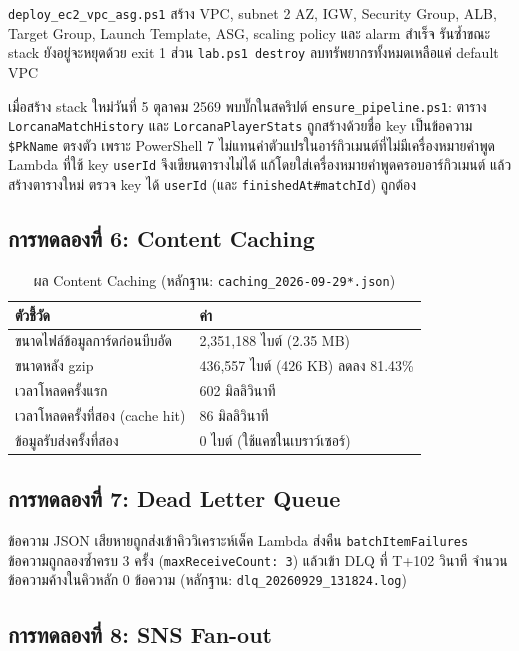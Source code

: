\texttt{deploy\_ec2\_vpc\_asg.ps1} สร้าง VPC, subnet 2 AZ, IGW, Security Group, ALB, Target Group, Launch Template, ASG, scaling policy และ alarm สำเร็จ รันซ้ำขณะ stack ยังอยู่จะหยุดด้วย exit 1 ส่วน \texttt{lab.ps1 destroy} ลบทรัพยากรทั้งหมดเหลือแค่ default VPC

เมื่อสร้าง stack ใหม่วันที่ 5 ตุลาคม 2569 พบบั๊กในสคริปต์ \texttt{ensure\_pipeline.ps1}: ตาราง \texttt{LorcanaMatchHistory} และ \texttt{LorcanaPlayerStats} ถูกสร้างด้วยชื่อ key เป็นข้อความ \texttt{\$PkName} ตรงตัว เพราะ PowerShell 7 ไม่แทนค่าตัวแปรในอาร์กิวเมนต์ที่ไม่มีเครื่องหมายคำพูด Lambda ที่ใช้ key \texttt{userId} จึงเขียนตารางไม่ได้ แก้โดยใส่เครื่องหมายคำพูดครอบอาร์กิวเมนต์ แล้วสร้างตารางใหม่ ตรวจ key ได้ \texttt{userId} (และ \texttt{finishedAt\#matchId}) ถูกต้อง

\subsection{การทดลองที่ 6: Content Caching}

\begin{table}[H]
\centering
\caption{ผล Content Caching (หลักฐาน: \texttt{caching\_2026-09-29*.json})}
\begin{tabularx}{\textwidth}{lX}
\toprule
\textbf{ตัวชี้วัด} & \textbf{ค่า} \\
\midrule
ขนาดไฟล์ข้อมูลการ์ดก่อนบีบอัด & 2,351,188 ไบต์ (2.35 MB) \\
ขนาดหลัง gzip & 436,557 ไบต์ (426 KB) ลดลง 81.43\% \\
เวลาโหลดครั้งแรก & 602 มิลลิวินาที \\
เวลาโหลดครั้งที่สอง (cache hit) & 86 มิลลิวินาที \\
ข้อมูลรับส่งครั้งที่สอง & 0 ไบต์ (ใช้แคชในเบราว์เซอร์) \\
\bottomrule
\end{tabularx}
\end{table}

\subsection{การทดลองที่ 7: Dead Letter Queue}

ข้อความ JSON เสียหายถูกส่งเข้าคิววิเคราะห์เด็ค Lambda ส่งคืน \texttt{batchItemFailures} ข้อความถูกลองซ้ำครบ 3 ครั้ง (\texttt{maxReceiveCount: 3}) แล้วเข้า DLQ ที่ T+102 วินาที จำนวนข้อความค้างในคิวหลัก 0 ข้อความ (หลักฐาน: \texttt{dlq\_20260929\_131824.log})

\subsection{การทดลองที่ 8: SNS Fan-out}

